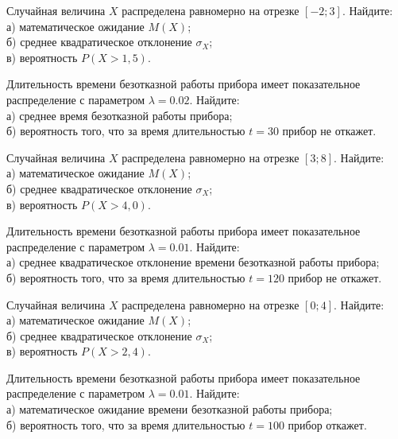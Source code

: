 \vfill

\newpage\setcounter{zad}{0}

\z Случайная величина $X$ распределена равномерно на отрезке $[-2; 3]$. Найдите: \\ \quad а) математическое ожидание $M(X)$; \\ \quad б) среднее квадратическое отклонение $\sigma_X$; \\ \quad в) вероятность $P(X>1{,}5)$.


\vfill

\z Длительность времени безотказной работы прибора имеет показательное распределение с параметром $\lambda = 0.02$. Найдите: \\ \quad а) среднее время безотказной работы прибора; \\ \quad б) вероятность того, что за время длительностью $t = 30$ прибор не откажет.
 

\vfill

\newpage\setcounter{zad}{0}

\z Случайная величина $X$ распределена равномерно на отрезке $[3; 8]$. Найдите: \\ \quad а) математическое ожидание $M(X)$; \\ \quad б) среднее квадратическое отклонение $\sigma_X$; \\ \quad в) вероятность $P(X>4{,}0)$.


\vfill

\z Длительность времени безотказной работы прибора имеет показательное распределение с параметром $\lambda = 0.01$. Найдите: \\ \quad а) среднее квадратическое отклонение времени безотказной работы прибора; \\ \quad б) вероятность того, что за время длительностью $t = 120$ прибор не откажет.
 

\vfill

\newpage\setcounter{zad}{0}

\z Случайная величина $X$ распределена равномерно на отрезке $[0; 4]$. Найдите: \\ \quad а) математическое ожидание $M(X)$; \\ \quad б) среднее квадратическое отклонение $\sigma_X$; \\ \quad в) вероятность $P(X>2{,}4)$.


\vfill

\z Длительность времени безотказной работы прибора имеет показательное распределение с параметром $\lambda = 0.01$. Найдите: \\ \quad а) математическое ожидание времени безотказной работы прибора; \\ \quad б) вероятность того, что за время длительностью $t = 100$ прибор откажет.
 

